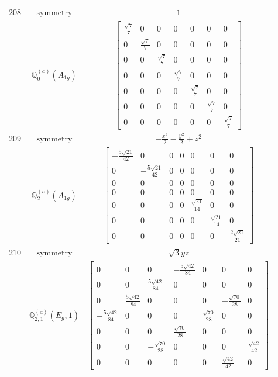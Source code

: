 \documentclass[fleqn,8pt,landscape]{jsarticle}
\begin{document}
\begin{longtable}{ccc}
$ 208 $ & $ \text{symmetry} $ & $ 1 $ \\
$  $ & $ \mathbb{Q}_{0}^{(a)}(A_{1g}) $ & $ \begin{bmatrix} \frac{\sqrt{7}}{7} & 0 & 0 & 0 & 0 & 0 & 0 \\ 0 & \frac{\sqrt{7}}{7} & 0 & 0 & 0 & 0 & 0 \\ 0 & 0 & \frac{\sqrt{7}}{7} & 0 & 0 & 0 & 0 \\ 0 & 0 & 0 & \frac{\sqrt{7}}{7} & 0 & 0 & 0 \\ 0 & 0 & 0 & 0 & \frac{\sqrt{7}}{7} & 0 & 0 \\ 0 & 0 & 0 & 0 & 0 & \frac{\sqrt{7}}{7} & 0 \\ 0 & 0 & 0 & 0 & 0 & 0 & \frac{\sqrt{7}}{7} \end{bmatrix} $ \\ \hline
$ 209 $ & $ \text{symmetry} $ & $ - \frac{x^{2}}{2} - \frac{y^{2}}{2} + z^{2} $ \\
$  $ & $ \mathbb{Q}_{2}^{(a)}(A_{1g}) $ & $ \begin{bmatrix} - \frac{5 \sqrt{21}}{42} & 0 & 0 & 0 & 0 & 0 & 0 \\ 0 & - \frac{5 \sqrt{21}}{42} & 0 & 0 & 0 & 0 & 0 \\ 0 & 0 & 0 & 0 & 0 & 0 & 0 \\ 0 & 0 & 0 & 0 & 0 & 0 & 0 \\ 0 & 0 & 0 & 0 & \frac{\sqrt{21}}{14} & 0 & 0 \\ 0 & 0 & 0 & 0 & 0 & \frac{\sqrt{21}}{14} & 0 \\ 0 & 0 & 0 & 0 & 0 & 0 & \frac{2 \sqrt{21}}{21} \end{bmatrix} $ \\ \hline
$ 210 $ & $ \text{symmetry} $ & $ \sqrt{3} y z $ \\
$  $ & $ \mathbb{Q}_{2,1}^{(a)}(E_{g},1) $ & $ \begin{bmatrix} 0 & 0 & 0 & - \frac{5 \sqrt{42}}{84} & 0 & 0 & 0 \\ 0 & 0 & \frac{5 \sqrt{42}}{84} & 0 & 0 & 0 & 0 \\ 0 & \frac{5 \sqrt{42}}{84} & 0 & 0 & 0 & - \frac{\sqrt{70}}{28} & 0 \\ - \frac{5 \sqrt{42}}{84} & 0 & 0 & 0 & \frac{\sqrt{70}}{28} & 0 & 0 \\ 0 & 0 & 0 & \frac{\sqrt{70}}{28} & 0 & 0 & 0 \\ 0 & 0 & - \frac{\sqrt{70}}{28} & 0 & 0 & 0 & \frac{\sqrt{42}}{42} \\ 0 & 0 & 0 & 0 & 0 & \frac{\sqrt{42}}{42} & 0 \end{bmatrix} $ \\ \hline

\end{longtable}
\end{document}
